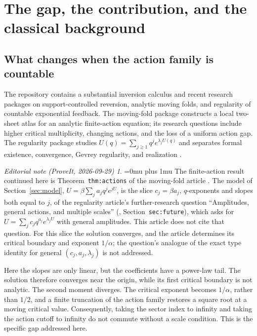 \documentclass[11pt,a4paper]{article}
\numberwithin{equation}{section}
\theoremstyle{definition}
\theoremstyle{remark}
\newtheorem*{ednoteinner}{Editorial note (ProveIt, 2026-09-29)}
\newenvironment{ednote}{\begin{ednoteinner}\sloppy\Urlmuskip=0mu plus 1mu\relax}{\end{ednoteinner}}
\begin{document}
\clearpage
\tableofcontents
\clearpage

\section{The gap, the contribution, and the classical background}
\label{sec:intro}

\subsection{What changes when the action family is countable}
The repository contains a substantial inversion calculus and recent
research packages on support-controlled reversion, analytic moving folds,
and regularity of countable exponential feedback. The moving-fold package
constructs a local two-sheet atlas for an analytic finite-action equation;
its research questions include higher critical multiplicity, changing
actions, and the loss of a uniform action gap. The regularity package
studies $U(q)=\sum_{j\ge1}q^j e^{\lambda_jU(q)}$ and separates formal
existence, convergence, Gevrey regularity, and realization
\cite{repo-index,repo-fold,repo-regularity}.
\begin{ednote}
The finite-action result continued here is Theorem~\texttt{thm:actions} of
the moving-fold article \cite{repo-fold}. The model of
Section~\ref{sec:model}, $U=\beta\sum_j a_jq^je^{jU}$, is the slice
$c_j=\beta a_j$, $q$-exponents and slopes both equal to $j$, of the
regularity article's further-research question ``Amplitudes, general
actions, and multiple scales'' (,
Section~\texttt{sec:future}), which asks for $U=\sum_jc_jq^{a_j}e^{\lambda_jU}$
with general amplitudes. This article does not cite that question. For this
slice the solution converges, and the article determines its critical
boundary and exponent $1/\alpha$; the question's analogue of the exact type
identity for general $(c_j,a_j,\lambda_j)$ is not addressed.
\end{ednote}

Here the slopes are only linear, but the coefficients have a power-law
tail. The solution therefore converges near the origin, while its first
critical boundary is not analytic. The second moment diverges. The
critical exponent becomes $1/\alpha$, rather than $1/2$, and a finite
truncation of the action family restores a square root at a moving
critical value. Consequently, taking the sector index to infinity and
taking the action cutoff to infinity do not commute without a scale
condition. This is the specific gap addressed here.
\end{document}
